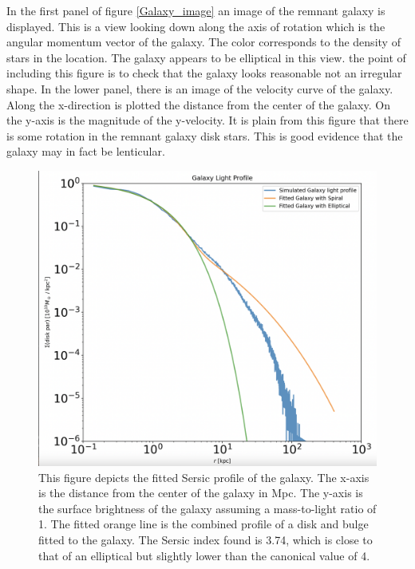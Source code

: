 \documentclass[fleqn,usenatbib]{mnras}
\begin{document}
In the first panel of figure \ref{Galaxy_image} an image of the remnant galaxy is displayed. This is a view looking down along the axis of rotation which is the angular momentum vector of the galaxy. The color corresponds to the density of stars in the location. The galaxy appears to be elliptical in this view. the point of including this figure is to check that the galaxy looks reasonable not an irregular shape. In the lower panel, there is an image of the velocity curve of the galaxy. Along the x-direction is plotted the distance from the center of the galaxy. On the y-axis is the magnitude of the y-velocity. It is plain from this figure that there is some rotation in the remnant galaxy disk stars. This is good evidence that the galaxy may in fact be lenticular.


\begin{figure}
    \centering
    \includegraphics[scale=0.25]{Figures/Screenshot 2023-05-05 at 12.29.21 AM.png}
    \caption{This figure depicts the fitted Sersic profile of the galaxy. The x-axis is the distance from the center of the galaxy in Mpc. The y-axis is the surface brightness of the galaxy assuming a mass-to-light ratio of 1. The fitted orange line is the combined profile of a disk and bulge fitted to the galaxy. The Sersic index found is 3.74, which is close to that of an elliptical but slightly lower than the canonical value of 4.}
    \label{light_profile}
\end{figure} 
\end{document}
